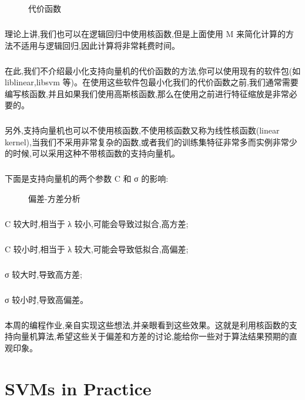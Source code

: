 \documentclass{article}
\begin{document}
\begin{CJK}{UTF8}{gbsn}
\begin{figure}[H]
\label{fig:744}
\caption{代价函数}
\end{figure}
\subparagraph{}
理论上讲,我们也可以在逻辑回归中使用核函数,但是上面使用 M 来简化计算的方法不适用与逻辑回归,因此计算将非常耗费时间。
\subparagraph{}
在此,我们不介绍最小化支持向量机的代价函数的方法,你可以使用现有的软件包(如liblinear,libsvm 等)。在使用这些软件包最小化我们的代价函数之前,我们通常需要编写核函数,并且如果我们使用高斯核函数,那么在使用之前进行特征缩放是非常必要的。
\subparagraph{}
另外,支持向量机也可以不使用核函数,不使用核函数又称为线性核函数(linear kernel),当我们不采用非常复杂的函数,或者我们的训练集特征非常多而实例非常少的时候,可以采用这种不带核函数的支持向量机。
\subparagraph{}
下面是支持向量机的两个参数 C 和 σ 的影响:
\begin{figure}[H]
\label{fig:745}
\caption{偏差-方差分析}
\end{figure}
\subparagraph{}
C 较大时,相当于 λ 较小,可能会导致过拟合,高方差;
\subparagraph{}
C 较小时,相当于 λ 较大,可能会导致低拟合,高偏差;
\subparagraph{}
σ 较大时,导致高方差;
\subparagraph{}
σ 较小时,导致高偏差。
\begin{figure}[H]
\label{fig:746}
\end{figure}
\subparagraph{}
本周的编程作业,亲自实现这些想法,并亲眼看到这些效果。这就是利用核函数的支持向量机算法,希望这些关于偏差和方差的讨论,能给你一些对于算法结果预期的直观印象。
\section{SVMs in Practice}

\end{CJK}
\end{document}
